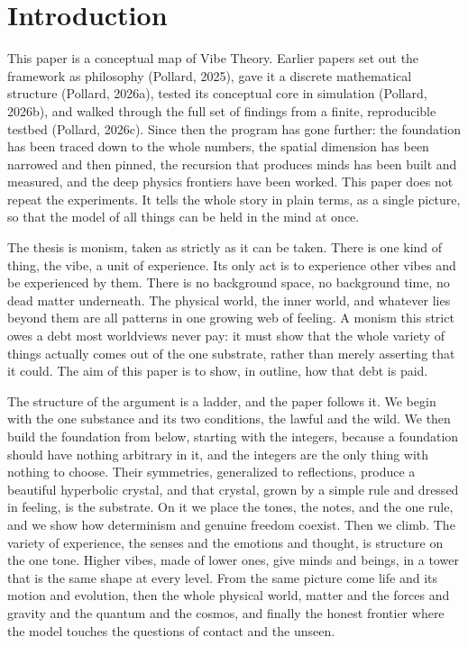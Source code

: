 \section{Introduction}
\label{sec:introduction}

This paper is a conceptual map of Vibe Theory. Earlier papers set out the framework as
philosophy (Pollard, 2025), gave it a discrete mathematical structure (Pollard, 2026a), tested
its conceptual core in simulation (Pollard, 2026b), and walked through the full set of findings
from a finite, reproducible testbed (Pollard, 2026c). Since then the program has gone further:
the foundation has been traced down to the whole numbers, the spatial dimension has been
narrowed and then pinned, the recursion that produces minds has been built and measured, and
the deep physics frontiers have been worked. This paper does not repeat the experiments. It
tells the whole story in plain terms, as a single picture, so that the model of all things can
be held in the mind at once.

The thesis is monism, taken as strictly as it can be taken. There is one kind of thing, the
vibe, a unit of experience. Its only act is to experience other vibes and be experienced by
them. There is no background space, no background time, no dead matter underneath. The
physical world, the inner world, and whatever lies beyond them are all patterns in one
growing web of feeling. A monism this strict owes a debt most worldviews never pay: it must
show that the whole variety of things actually comes out of the one substrate, rather than
merely asserting that it could. The aim of this paper is to show, in outline, how that debt
is paid.

The structure of the argument is a ladder, and the paper follows it. We begin with the one
substance and its two conditions, the lawful and the wild. We then build the foundation from
below, starting with the integers, because a foundation should have nothing arbitrary in it,
and the integers are the only thing with nothing to choose. Their symmetries, generalized to
reflections, produce a beautiful hyperbolic crystal, and that crystal, grown by a simple
rule and dressed in feeling, is the substrate. On it we place the tones, the notes, and the
one rule, and we show how determinism and genuine freedom coexist. Then we climb. The variety
of experience, the senses and the emotions and thought, is structure on the one tone. Higher
vibes, made of lower ones, give minds and beings, in a tower that is the same shape at every
level. From the same picture come life and its motion and evolution, then the whole physical
world, matter and the forces and gravity and the quantum and the cosmos, and finally the
honest frontier where the model touches the questions of contact and the unseen.

